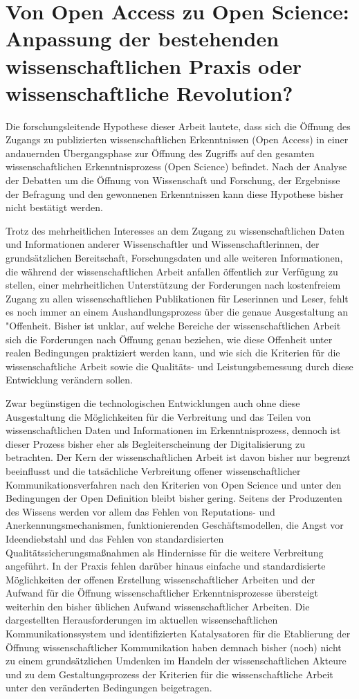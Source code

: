 \section{Von Open Access zu Open Science: Anpassung der bestehenden wissenschaftlichen Praxis oder wissenschaftliche Revolution?}

Die forschungsleitende Hypothese dieser Arbeit lautete, dass sich die Öffnung des Zugangs zu publizierten wissenschaftlichen Erkenntnissen (Open Access) in einer andauernden Übergangsphase zur Öffnung des Zugriffs auf den gesamten wissenschaftlichen Erkenntnisprozess (Open Science) befindet. Nach der Analyse der Debatten um die Öffnung von Wissenschaft und Forschung, der Ergebnisse der Befragung und den gewonnenen Erkenntnissen kann diese Hypothese bisher nicht bestätigt werden.

Trotz des mehrheitlichen Interesses an dem Zugang zu wissenschaftlichen Daten und Informationen anderer Wissenschaftler und Wissenschaftlerinnen, der grundsätzlichen Bereitschaft, Forschungsdaten und alle weiteren Informationen, die während der wissenschaftlichen Arbeit anfallen öffentlich zur Verfügung zu stellen, einer mehrheitlichen Unterstützung der Forderungen nach kostenfreiem Zugang zu allen wissenschaftlichen Publikationen für Leserinnen und Leser, fehlt es noch immer an einem Aushandlungsprozess über die genaue Ausgestaltung an "Offenheit. Bisher ist unklar, auf welche Bereiche der wissenschaftlichen Arbeit sich die Forderungen nach Öffnung genau beziehen, wie diese Offenheit unter realen Bedingungen praktiziert werden kann, und wie sich die Kriterien für die wissenschaftliche Arbeit sowie die Qualitäts- und Leistungsbemessung durch diese Entwicklung verändern sollen.

Zwar begünstigen die technologischen Entwicklungen auch ohne diese Ausgestaltung die Möglichkeiten für die Verbreitung und das Teilen von wissenschaftlichen Daten und Informationen im Erkenntnisprozess, dennoch ist dieser Prozess bisher eher als Begleiterscheinung der Digitalisierung zu betrachten. Der Kern der wissenschaftlichen Arbeit ist davon bisher nur begrenzt beeinflusst und die tatsächliche Verbreitung offener wissenschaftlicher Kommunikationsverfahren nach den Kriterien von Open Science und unter den Bedingungen der Open Definition bleibt bisher gering. Seitens der Produzenten des Wissens werden vor allem das Fehlen von Reputations- und Anerkennungsmechanismen, funktionierenden Geschäftsmodellen, die Angst vor Ideendiebstahl und das Fehlen von standardisierten Qualitätssicherungsmaßnahmen als Hindernisse für die weitere Verbreitung angeführt. In der Praxis fehlen darüber hinaus einfache und standardisierte Möglichkeiten der offenen Erstellung wissenschaftlicher Arbeiten und der Aufwand für die Öffnung wissenschaftlicher Erkenntnisprozesse übersteigt weiterhin den bisher üblichen Aufwand wissenschaftlicher Arbeiten. Die dargestellten Herausforderungen im aktuellen wissenschaftlichen Kommunikationssystem und identifizierten Katalysatoren für die Etablierung der Öffnung wissenschaftlicher Kommunikation haben demnach bisher (noch) nicht zu einem grundsätzlichen Umdenken im Handeln der wissenschaftlichen Akteure und zu dem Gestaltungsprozess der Kriterien für die wissenschaftliche Arbeit unter den veränderten Bedingungen beigetragen.

